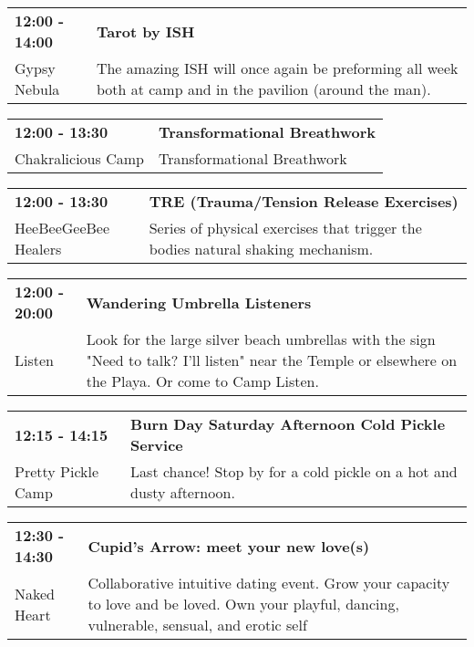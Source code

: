 \begin{tabular}{ p{1in} p{2.2in} }
    \textbf{12:00 - 14:00} & \textbf{Tarot by ISH} \\
    Gypsy Nebula \newline  & The amazing ISH will once again be preforming all week both at camp and in the pavilion (around the man). \\
    \hline 
\end{tabular}
    
\begin{tabular}{ p{1in} p{2.2in} }
    \textbf{12:00 - 13:30} & \textbf{Transformational Breathwork} \\
    Chakralicious Camp \newline  & Transformational Breathwork \\
    \hline 
\end{tabular}
    
\begin{tabular}{ p{1in} p{2.2in} }
    \textbf{12:00 - 13:30} & \textbf{TRE (Trauma/Tension Release Exercises)} \\
    HeeBeeGeeBee Healers \newline  & Series of physical exercises that trigger the bodies natural shaking mechanism. \\
    \hline 
\end{tabular}
    
\begin{tabular}{ p{1in} p{2.2in} }
    \textbf{12:00 - 20:00} & \textbf{Wandering Umbrella Listeners} \\
    Listen \newline  & Look for the large silver beach umbrellas with the sign "Need to talk? I'll listen" near the Temple or elsewhere on the Playa. Or come to Camp Listen. \\
    \hline 
\end{tabular}
    
\begin{tabular}{ p{1in} p{2.2in} }
    \textbf{12:15 - 14:15} & \textbf{Burn Day Saturday Afternoon Cold Pickle Service} \\
    Pretty Pickle Camp \newline  & Last chance! Stop by for a cold pickle on a hot and dusty afternoon. \\
    \hline 
\end{tabular}
    
\begin{tabular}{ p{1in} p{2.2in} }
    \textbf{12:30 - 14:30} & \textbf{Cupid's Arrow: meet your new love(s)} \\
    Naked Heart \newline  & Collaborative intuitive dating event. Grow your capacity to love and be loved. Own your playful, dancing, vulnerable, sensual, and erotic self \\
    \hline 
\end{tabular}
    
